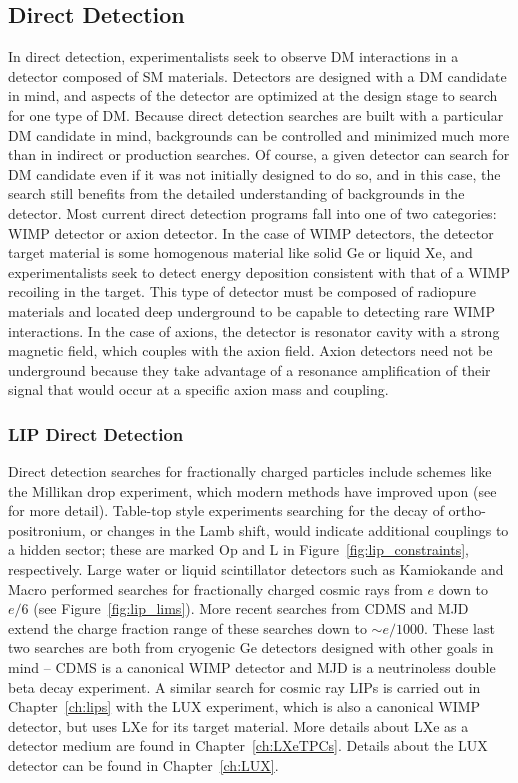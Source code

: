 \subsection{Direct Detection}
In direct detection, experimentalists seek to observe \ac{DM} interactions in a detector composed of \ac{SM} materials. Detectors are designed with a \ac{DM} candidate in mind, and aspects of the detector are optimized at the design stage to search for one type of \ac{DM}. Because direct detection searches are built with a particular \ac{DM} candidate in mind, backgrounds can be controlled and minimized much more than in indirect or production searches. Of course, a given detector can search for \ac{DM} candidate even if it was not initially designed to do so, and in this case, the search still benefits from the detailed understanding of backgrounds in the detector. Most current direct detection programs fall into one of two categories: \ac{WIMP} detector or axion detector. In the case of \ac{WIMP} detectors, the detector target material is some homogenous material like solid Ge or liquid Xe, and experimentalists seek to detect energy deposition consistent with that of a \ac{WIMP} recoiling in the target. This type of detector must be composed of radiopure materials and located deep underground to be capable to detecting rare \ac{WIMP} interactions. In the case of axions, the detector is resonator cavity with a strong magnetic field, which couples with the axion field. Axion detectors need not be underground because they take advantage of a resonance amplification of their signal that would occur at a specific axion mass and coupling.

\subsubsection{LIP Direct Detection}
Direct detection searches for fractionally charged particles include schemes like the Millikan drop experiment, which modern methods have improved upon (see \cite{Perl2009} for more detail). Table-top style experiments searching for the decay of ortho-positronium, or changes in the Lamb shift, would indicate additional couplings to a hidden sector; these are marked Op and L in Figure~\ref{fig:lip_constraints}, respectively. Large water or liquid scintillator detectors such as Kamiokande and Macro performed searches for fractionally charged cosmic rays from $e$ down to $e/6$ (see Figure~\ref{fig:lip_lims}). More recent searches from \ac{CDMS} and \ac{MJD} extend the charge fraction range of these searches down to $\sim e/1000$. These last two searches are both from cryogenic Ge detectors designed with other goals in mind -- \ac{CDMS} is a canonical \ac{WIMP} detector and \ac{MJD} is a neutrinoless double beta decay experiment. A similar search for cosmic ray \ac{LIP}s is carried out in Chapter~\ref{ch:lips} with the \ac{LUX} experiment, which is also a canonical \ac{WIMP} detector, but uses \ac{LXe} for its target material. More details about \ac{LXe} as a detector medium are found in Chapter~\ref{ch:LXeTPCs}. Details about the \ac{LUX} detector can be found in Chapter~\ref{ch:LUX}.



